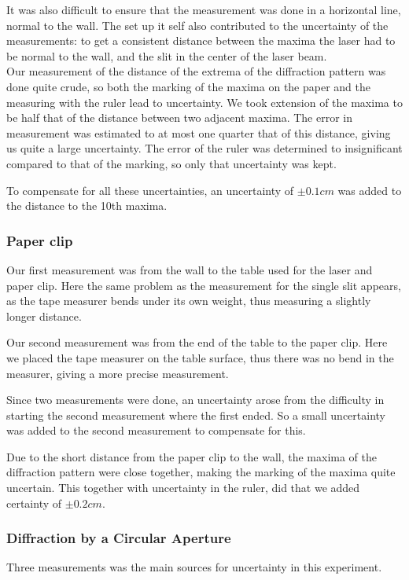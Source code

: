 \documentclass{emulateapj}
\begin{document}
It was also difficult to ensure that the measurement was done in a horizontal line, normal to the wall. The set up it self also contributed to the uncertainty of the measurements: to get a consistent distance between the maxima the laser had to be normal to the wall, and the slit in the center of the laser beam. \\

Our measurement of the distance of the extrema of the diffraction pattern was done quite crude, so both the marking of the maxima on the paper and the measuring with the ruler lead to uncertainty. We took extension of the maxima to be half that of the distance between two adjacent maxima. The error in measurement was estimated to at most one quarter that of this distance, giving us quite a large uncertainty. The error of the ruler was determined to insignificant compared to that of the marking, so only that uncertainty was kept.

To compensate for all these uncertainties, an uncertainty of $\pm 0.1 cm$ was added to the distance to the 10th maxima.


\subsubsection{Paper clip}
Our first measurement was from the wall to the table used for the laser and paper clip. Here the same problem as the measurement for the single slit appears, as the tape measurer bends under its own weight, thus measuring a slightly longer distance. 

Our second measurement was from the end of the table to the paper clip. Here we placed the tape measurer on the table surface, thus there was no bend in the measurer, giving a more precise measurement. 

Since two measurements were done, an uncertainty arose from the difficulty in starting the second measurement where the first ended. So a small uncertainty was added to the second measurement to compensate for this.

Due to the short distance from the paper clip to the wall, the maxima of the diffraction pattern were close together, making the marking of the maxima quite uncertain. This together with uncertainty in the ruler, did that we added certainty of $\pm 0.2 cm$. 

\subsubsection{Diffraction by a Circular Aperture}
Three measurements was the main sources for uncertainty in this experiment.
\end{document}
